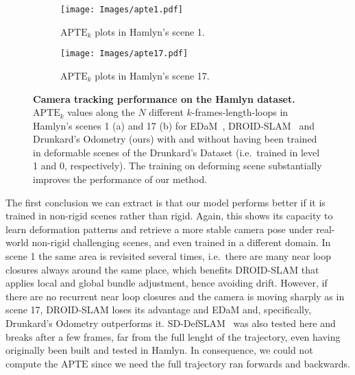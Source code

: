 \documentclass{article}
\begin{document}
\begin{figure}
\begin{subfigure}{.49\textwidth}
  \centering
  \texttt{[image: Images/apte1.pdf]}  \\[-6pt]
  \caption{\footnotesize $\mathrm{APTE}_k$ plots in Hamlyn's scene 1.
  }
    \label{fig:apte_1}

\end{subfigure}
\begin{subfigure}{.49\textwidth}
  \centering
  \texttt{[image: Images/apte17.pdf]}  \\[-6pt]
  \caption{\footnotesize $\mathrm{APTE}_k$ plots in Hamlyn's scene 17.}
    \label{fig:apte2}
\end{subfigure}
\vspace{-6pt}
\caption{\textbf{Camera tracking performance on the Hamlyn dataset.} $\mathrm{APTE}_k$ values along the $N$ different $k$-frames-length-loops in Hamlyn's scenes 1 (a) and 17 (b) for EDaM~\cite{recasens2021endo}, DROID-SLAM~\cite{teed2021droid} and Drunkard's Odometry (ours) with and without having been trained in deformable scenes of the Drunkard's Dataset (i.e.\ trained in level 1 and 0, respectively). The training on deforming scene substantially improves the performance of our method.}
\label{fig:apte_plots}
\end{figure}

The first conclusion we can extract is that our model performs better if it is trained in non-rigid scenes rather than rigid. Again, this shows its capacity to learn deformation patterns and retrieve a more stable camera pose under real-world non-rigid challenging scenes, and even trained in a different domain. In scene 1 the same area is revisited several times, i.e.\ there are many near loop closures always around the same place, which benefits DROID-SLAM that applies local and global bundle adjustment, hence avoiding drift. However, if there are no recurrent near loop closures and the camera is moving sharply as in scene 17, DROID-SLAM loses its advantage and EDaM and, specifically, Drunkard's Odometry outperforms it.
SD-DefSLAM~\cite{gomez2021sd} was also tested here and breaks after a few frames, far from the full lenght of the trajectory, even having originally been built and tested in Hamlyn. In consequence, we could not compute the $\mathrm{APTE}$ since we need the full trajectory ran forwards and backwards.
\end{document}
